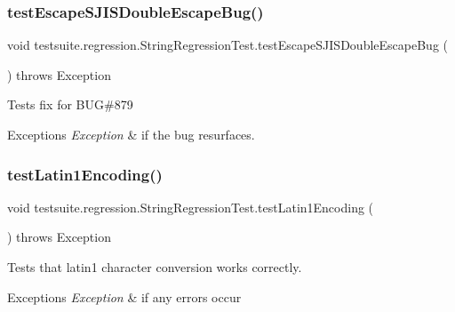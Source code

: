 \subsubsection{\texorpdfstring{test\+Escape\+S\+J\+I\+S\+Double\+Escape\+Bug()}{testEscapeSJISDoubleEscapeBug()}}
{\footnotesize\ttfamily void testsuite.\+regression.\+String\+Regression\+Test.\+test\+Escape\+S\+J\+I\+S\+Double\+Escape\+Bug (\begin{DoxyParamCaption}{ }\end{DoxyParamCaption}) throws Exception}

Tests fix for B\+UG\#879


\begin{DoxyExceptions}{Exceptions}
{\em Exception} & if the bug resurfaces. \\
\hline
\end{DoxyExceptions}
\mbox{\label{classtestsuite_1_1regression_1_1_string_regression_test_abcc37c5fb4c57b3f201afaadbc55ee13}} 
\subsubsection{\texorpdfstring{test\+Latin1\+Encoding()}{testLatin1Encoding()}}
{\footnotesize\ttfamily void testsuite.\+regression.\+String\+Regression\+Test.\+test\+Latin1\+Encoding (\begin{DoxyParamCaption}{ }\end{DoxyParamCaption}) throws Exception}

Tests that \textquotesingle{}latin1\textquotesingle{} character conversion works correctly.


\begin{DoxyExceptions}{Exceptions}
{\em Exception} & if any errors occur \\
\hline
\end{DoxyExceptions}
\mbox{\label{classtestsuite_1_1regression_1_1_string_regression_test_a5e1296ac09b9d40f0116a776de542e0a}} 
